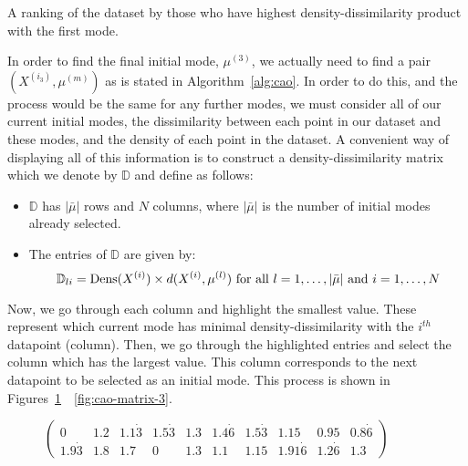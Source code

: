 \begin{example}
    \begin{table}[H]
    \resizebox{\textwidth}{!}{%
        
    }
    \caption{A ranking of the dataset by those who have highest
    density-dissimilarity product with the first mode.}\label{%
    tab:ranked-dens-dissim}
    \end{table}

    In order to find the final initial mode, \(\mu^{(3)}\), we actually need to
    find a pair \((X^{(i_3)}, \mu^{(m)})\) as is stated in 
    Algorithm~\ref{alg:cao}. In order to do this, and the process would be the
    same for any further modes, we must consider all of our current initial
    modes, the dissimilarity between each point in our dataset and these modes,
    and the density of each point in the dataset. A convenient way of displaying
    all of this information is to construct a density-dissimilarity matrix which
    we denote by \(\mathbb{D}\) and define as follows:
    \begin{itemize}
        \item \(\mathbb{D}\) has \(|\bar{\mu}|\) rows and \(N\) columns, where
            \(|\bar{\mu}|\) is the number of initial modes already selected.
        \item The entries of \(\mathbb{D}\) are given by:
            \[
                \mathbb{D}_{li} = \text{Dens}(X^{(i)}) \times d(X^{(i)},
                \mu^{(l)}) \ \text{for all} \ l = 1, \ldots, |\bar{\mu}| \
                \text{and} \ i = 1, \ldots, N \\
            \]
    \end{itemize}

    Now, we go through each column and highlight the smallest value. These
    represent which current mode has minimal density-dissimilarity with the
    \(i^{th}\) datapoint (column). Then, we go through the highlighted entries
    and select the column which has the largest value. This column corresponds
    to the next datapoint to be selected as an initial mode. This process is
    shown in Figures~\ref{fig:cao-matrix-1}~\-~\ref{fig:cao-matrix-3}.\\
    
    \begin{figure}[H]
        \centering
        \begin{minipage}{\textwidth}
            \centering
            \(
            \begin{pmatrix}
                0 & 1.2 & 1.1\dot{3} & 1.5\dot{3} & 1.3 & 1.4\dot{6} &
                1.5\dot{3} & 1.15 & 0.95 & 0.8\dot{6}
                \\
                1.9\dot{3} & 1.8 & 1.7 & 0 & 1.3 & 1.1 & 1.15 & 1.91\dot{6} &
                1.2\dot{6} & 1.3
            \end{pmatrix}
            \)
            \label{fig:cao-matrix-1}
        \end{minipage}\\


\end{figure}
\end{example}
